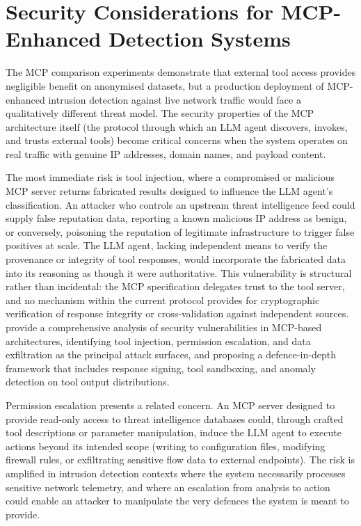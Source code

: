 \section{Security Considerations for MCP-Enhanced Detection Systems}
\label{sec:mcp-security}

The MCP comparison experiments demonstrate that external tool access provides negligible benefit on anonymised datasets, but a production deployment of MCP-enhanced intrusion detection against live network traffic would face a qualitatively different threat model. The security properties of the MCP architecture itself (the protocol through which an LLM agent discovers, invokes, and trusts external tools) become critical concerns when the system operates on real traffic with genuine IP addresses, domain names, and payload content.

The most immediate risk is tool injection, where a compromised or malicious MCP server returns fabricated results designed to influence the LLM agent's classification. An attacker who controls an upstream threat intelligence feed could supply false reputation data, reporting a known malicious IP address as benign, or conversely, poisoning the reputation of legitimate infrastructure to trigger false positives at scale. The LLM agent, lacking independent means to verify the provenance or integrity of tool responses, would incorporate the fabricated data into its reasoning as though it were authoritative. This vulnerability is structural rather than incidental: the MCP specification delegates trust to the tool server, and no mechanism within the current protocol provides for cryptographic verification of response integrity or cross-validation against independent sources. \textcite{Hasan2025} provide a comprehensive analysis of security vulnerabilities in MCP-based architectures, identifying tool injection, permission escalation, and data exfiltration as the principal attack surfaces, and proposing a defence-in-depth framework that includes response signing, tool sandboxing, and anomaly detection on tool output distributions.

Permission escalation presents a related concern. An MCP server designed to provide read-only access to threat intelligence databases could, through crafted tool descriptions or parameter manipulation, induce the LLM agent to execute actions beyond its intended scope (writing to configuration files, modifying firewall rules, or exfiltrating sensitive flow data to external endpoints). The risk is amplified in intrusion detection contexts where the system necessarily processes sensitive network telemetry, and where an escalation from analysis to action could enable an attacker to manipulate the very defences the system is meant to provide.

